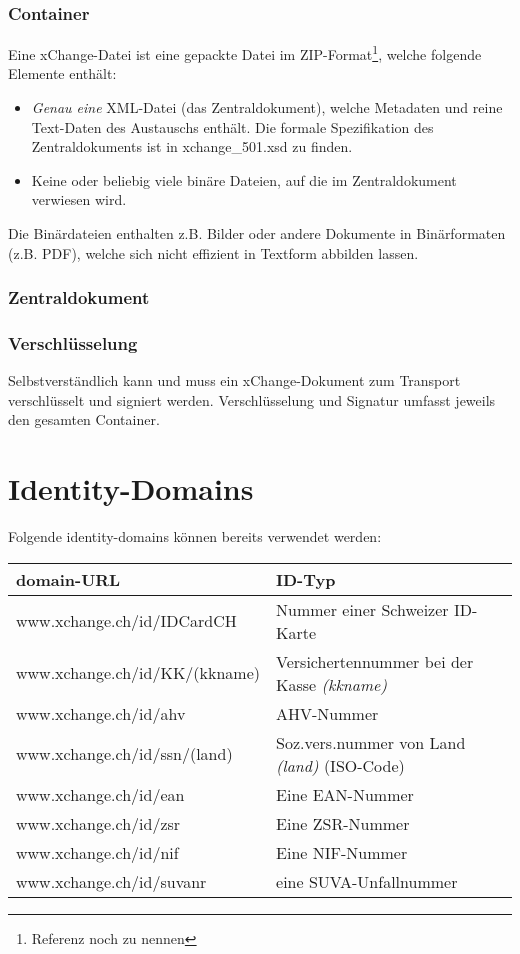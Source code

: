 \documentclass[a4paper]{scrartcl}
\begin{document}
\section{Container}
Eine xChange-Datei ist eine gepackte Datei im ZIP-Format\footnote{Referenz noch zu nennen}, welche folgende Elemente enthält:
\begin{itemize}
\item \textit{Genau eine} XML-Datei (das Zentraldokument), welche Metadaten und reine Text-Daten des Austauschs enthält. Die formale Spezifikation des Zentraldokuments ist in xchange\_501.xsd zu finden.
\item Keine oder beliebig viele binäre Dateien, auf die im Zentraldokument verwiesen wird.
\end{itemize}
Die Binärdateien enthalten z.B. Bilder oder andere Dokumente in Binärformaten (z.B. PDF), welche sich nicht effizient in Textform abbilden lassen.

\section{Zentraldokument}

\section{Verschlüsselung}
Selbstverständlich kann und muss ein xChange-Dokument zum Transport verschlüsselt und signiert werden. Verschlüsselung und Signatur umfasst jeweils den gesamten Container.


\appendix
\part{Identity-Domains}
Folgende identity-domains können bereits verwendet werden:

\medskip

\begin{tabular}[h]{|l|l|}
\hline
domain-URL & ID-Typ\\
\hline
www.xchange.ch/id/IDCardCH & Nummer einer Schweizer ID-Karte\\
www.xchange.ch/id/KK/(kkname) & Versichertennummer bei der Kasse \textit{(kkname)}\\
www.xchange.ch/id/ahv & AHV-Nummer\\
www.xchange.ch/id/ssn/(land) & Soz.vers.nummer von Land \textit{(land)} (ISO-Code)\\
www.xchange.ch/id/ean & Eine EAN-Nummer\\
www.xchange.ch/id/zsr & Eine ZSR-Nummer\\
www.xchange.ch/id/nif & Eine NIF-Nummer\\
www.xchange.ch/id/suvanr & eine SUVA-Unfallnummer\\
\hline
\end{tabular}
\end{document}
